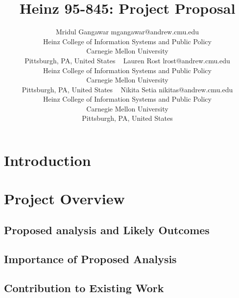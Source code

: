 \documentclass[twoside,11pt]{article}
\begin{document}
\title{Heinz 95-845: Project Proposal}

\author{\name Mridul Gangawar \email mgangawar@andrew.cmu.edu \\
       \addr Heinz College of Information Systems and Public Policy\\
       Carnegie Mellon University\\
       Pittsburgh, PA, United States \
       \AND
       \name Lauren Rost \email lrost@andrew.cmu.edu \\
       \addr Heinz College of Information Systems and Public Policy\\
       Carnegie Mellon University\\
       Pittsburgh, PA, United States \
       \AND
       \name Nikita Setia \email nikitas@andrew.cmu.edu \\
       \addr Heinz College of Information Systems and Public Policy\\
       Carnegie Mellon University\\
       Pittsburgh, PA, United States}
\maketitle


\section{Introduction}



\section{Project Overview} \label{details}

\subsection{Proposed analysis and Likely Outcomes}

\subsection{Importance of Proposed Analysis}

\subsection{Contribution to Existing Work}

\end{document}
